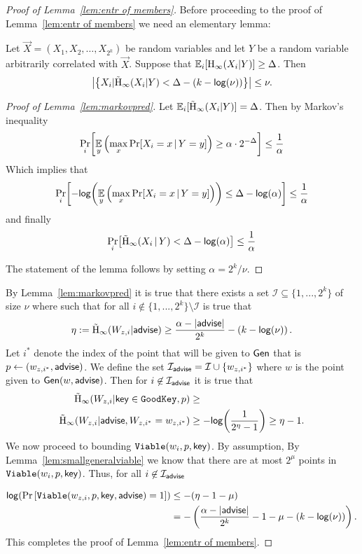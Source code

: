 \begin{proof}[Proof of Lemma~\ref{lem:entr of members}]
\noindent
Before proceeding to the proof of Lemma~\ref{lem:entr of members} we need an elementary lemma:
\begin{lemma}
    \label{lem:markovpred}
    Let $\vec{X} = (X_1, X_2, \ldots, X_{2^k})$ be random variables and let $Y$ be a random variable arbitrarily correlated with $\vec{X}$. Suppose that $\operatorname*{\mathbb{E}}_i[\mathrm{H}_\infty(X_i | Y)] \ge \Delta$. Then 
    \[
    \left|\left\{X_i | \tilde{\mathrm{H}}_\infty(X_i |Y) < \Delta - (k-\mathsf{log}\!\left(\nu\right))\right\}\right|\le \nu.
    \]
\end{lemma}
\begin{proof}[Proof of Lemma~\ref{lem:markovpred}]
Let $\operatorname*{\mathbb{E}}_i [\tilde{\mathrm{H}}_\infty(X_i|Y)] = \Delta$. Then by Markov's inequality
\[
    \Pr\limits_{i}\!\left[\operatorname*{\mathbb{E}}_{y}\left( \max\limits_{x} \Pr\!\left[X_i = x \,|\, Y = y\right]\right) \geq \alpha \cdot 2^{-\Delta}\right] \leq \frac{1}{\alpha} 
  \]
  Which implies that 
      \[  
    \Pr\limits_{i}\!\left[-\mathsf{log}\!\left(\operatorname*{\mathbb{E}}_y\left(\max\limits_{x} \Pr\!\left[X_i = x \,|\, Y = y\right]\right)\right) \leq \Delta -\mathsf{log}\!\left(\alpha\right)\right] \leq \frac{1}{\alpha} 
    \]
      and finally
        \[
      \Pr\limits_{i}\!\left[\tilde{\mathrm{H}}_\infty(X_i\, |\, Y)< \Delta -\mathsf{log}\!\left(\alpha\right)\right] \leq \frac{1}{\alpha}
      \]

The statement of the lemma follows by setting $\alpha = 2^k/\nu$.
\end{proof}
By Lemma~\ref{lem:markovpred} it is true that there exists a set $\mathcal{I}\subseteq \{1,...,2^k\}$ of size $\nu$ where  such that for all $i\not \in \{1,...,2^k\} \setminus\mathcal{I}$ is true that 
\[
\eta:=\tilde{\mathrm{H}}_\infty(W_{z,i} | {\mathsf{advise}}) \ge \frac{\alpha -|{\mathsf{advise}}|}{2^k} -\left(k-\mathsf{log}\!\left(\nu\right)\right).
\]
Let $i^*$ denote the index of the point that will be given to ${\mathsf{Gen}}$ that is $p\leftarrow (w_{z,i^*}, {\mathsf{advise}})$.  We define the set $\mathcal{I}_{\mathsf{advise}} = \mathcal{I} \cup \{w_{z,i^*}\}$ where $w$ is the point given to ${\mathsf{Gen}}(w, {\mathsf{advise}})$.  
Then for $i\not\in \mathcal{I}_{{\mathsf{advise}}}$ it is true that 
\begin{align*}
\tilde{\mathrm{H}}_\infty(W_{z,i} | \mathsf{key} \in \mathtt{GoodKey}, p)&\ge \\
\tilde{\mathrm{H}}_\infty(W_{z,i} | {\mathsf{advise}}, W_{z,i^*}= w_{z,i^*}) &\ge -\mathsf{log}\!\left(\frac{1}{2^{\eta}-1}\right) \ge \eta-1.
\end{align*}
We now proceed to bounding $\mathtt{Viable}(w_i, p, \mathsf{key})$.  By assumption, By Lemma~\ref{lem:smallgeneralviable} we know that there are at most $2^\mu$ points in $\mathtt{Viable}(w_i, p, \mathsf{key})$.  Thus, for all $i\not \in\mathcal{I}_{{\mathsf{advise}}}$ 

\begin{align*}
\mathsf{log}\!\left(\Pr\left[\mathtt{Viable}(w_{z,i}, p, \mathsf{key}, {\mathsf{advise}}) = 1 \right]\right)&\le - (\eta-1 -\mu) \\
&=-\left(\frac{\alpha -|{\mathsf{advise}}| }{2^k}-1-\mu-\left(k-\mathsf{log}\!\left(\nu\right)\right)\right).
\end{align*}
This completes the proof of Lemma~\ref{lem:entr of members}.
\end{proof}


